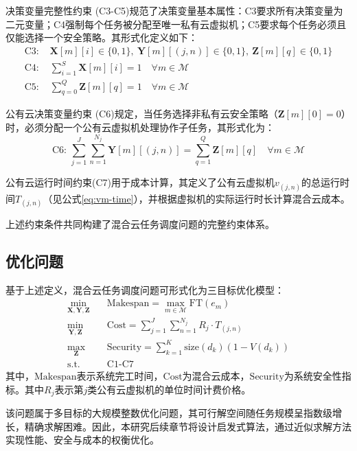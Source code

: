 决策变量完整性约束 (C3-C5)规范了决策变量基本属性：C3要求所有决策变量为二元变量；C4强制每个任务被分配至唯一私有云虚拟机；C5要求每个任务必须且仅能选择一个安全策略。其形式化定义如下：
\begin{align}
    \text{C3: } & \mathbf{X}[m][i] \in \{0,1\}, \ \mathbf{Y}[m][(j,n)] \in \{0,1\}, \ \mathbf{Z}[m][q] \in \{0,1\} \\
    \text{C4: } & \sum_{i=1}^S \mathbf{X}[m][i] = 1 \quad \forall m \in \mathcal{M} \\
    \text{C5: } & \sum_{q=0}^Q \mathbf{Z}[m][q] = 1 \quad \forall m \in \mathcal{M}
\end{align}

公有云决策变量约束 (C6)规定，当任务选择非私有云安全策略（\(\mathbf{Z}[m][0] = 0\)）时，必须分配一个公有云虚拟机处理协作子任务，其形式化为：
\begin{equation}
    \text{C6: }
    \sum_{j=1}^J \sum_{n=1}^{N_j} \mathbf{Y}[m][(j,n)] = \sum_{q=1}^Q \mathbf{Z}[m][q] \quad \forall m \in \mathcal{M}
\end{equation}

公有云运行时间约束(C7)用于成本计算，其定义了公有云虚拟机$v_{(j,n)}$的总运行时间\(T_{(j, n)}\)（见公式\eqref{eq:vm-time}），并根据虚拟机的实际运行时长计算混合云成本。

上述约束条件共同构建了混合云任务调度问题的完整约束体系。

\subsection{优化问题}
基于上述定义，混合云任务调度问题可形式化为三目标优化模型：
\begin{equation}
    \begin{aligned}
        \min_{\mathbf{X},\mathbf{Y},\mathbf{Z}} \quad & \text{Makespan} = \max_{m \in \mathcal{M}} \text{FT}(e_m) \\
        \min_{\mathbf{Y},\mathbf{Z}} \quad & \text{Cost} = \sum_{j=1}^J \sum_{n=1}^{N_j} R_j \cdot T_{(j,n)} \\
        \max_{\mathbf{Z}} \quad & \text{Security} = \sum_{k=1}^K \text{size}(d_k)(1 - V(d_k)) \\
        \text{s.t.} \quad & \text{C1-C7}
    \end{aligned}
\end{equation}
其中，\(\text{Makespan}\)表示系统完工时间，\(\text{Cost}\)为混合云成本，\(\text{Security}\)为系统安全性指标。其中\(R_j\)表示第\(j\)类公有云虚拟机的单位时间计费价格。

该问题属于多目标的大规模整数优化问题，其可行解空间随任务规模呈指数级增长，精确求解困难。因此，本研究后续章节将设计启发式算法，通过近似求解方法实现性能、安全与成本的权衡优化。

